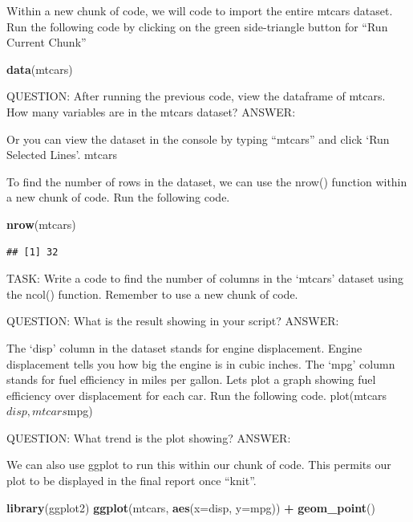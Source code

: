 \documentclass[
]{article}
\newenvironment{Shaded}{\begin{snugshade}}{\end{snugshade}}
\newcommand{\AttributeTok}[1]{\textcolor[rgb]{0.13,0.29,0.53}{#1}}
\newcommand{\FunctionTok}[1]{\textcolor[rgb]{0.13,0.29,0.53}{\textbf{#1}}}
\newcommand{\NormalTok}[1]{#1}
\newcommand{\SpecialCharTok}[1]{\textcolor[rgb]{0.81,0.36,0.00}{\textbf{#1}}}
\begin{document}
Within a new chunk of code, we will code to import the entire mtcars
dataset. Run the following code by clicking on the green side-triangle
button for ``Run Current Chunk''

\begin{Shaded}
\begin{Highlighting}[]
\FunctionTok{data}\NormalTok{(mtcars)}
\end{Highlighting}
\end{Shaded}

QUESTION: After running the previous code, view the dataframe of mtcars.
How many variables are in the mtcars dataset? ANSWER:

Or you can view the dataset in the console by typing ``mtcars'' and
click `Run Selected Lines'. mtcars

To find the number of rows in the dataset, we can use the nrow()
function within a new chunk of code. Run the following code.

\begin{Shaded}
\begin{Highlighting}[]
\FunctionTok{nrow}\NormalTok{(mtcars)}
\end{Highlighting}
\end{Shaded}

\begin{verbatim}
## [1] 32
\end{verbatim}

TASK: Write a code to find the number of columns in the `mtcars' dataset
using the ncol() function. Remember to use a new chunk of code.

QUESTION: What is the result showing in your script? ANSWER:

The `disp' column in the dataset stands for engine displacement. Engine
displacement tells you how big the engine is in cubic inches. The `mpg'
column stands for fuel efficiency in miles per gallon. Lets plot a graph
showing fuel efficiency over displacement for each car. Run the
following code. plot(mtcars\(disp, mtcars\)mpg)

QUESTION: What trend is the plot showing? ANSWER:

We can also use ggplot to run this within our chunk of code. This
permits our plot to be displayed in the final report once ``knit''.

\begin{Shaded}
\begin{Highlighting}[]
\FunctionTok{library}\NormalTok{(ggplot2)}
\FunctionTok{ggplot}\NormalTok{(mtcars, }\FunctionTok{aes}\NormalTok{(}\AttributeTok{x=}\NormalTok{disp, }\AttributeTok{y=}\NormalTok{mpg)) }\SpecialCharTok{+} \FunctionTok{geom\_point}\NormalTok{()}
\end{Highlighting}
\end{Shaded}
\end{document}
